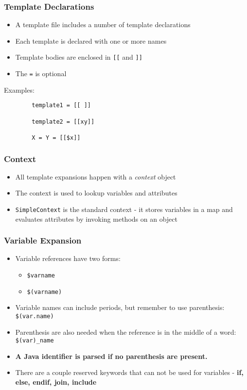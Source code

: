 \documentclass[a4paper,12pt,presentation]{beamer}
\begin{document}
\begin{frame}[fragile]
    \frametitle{Template Declarations}

    \begin{itemize}
        \item A template file includes a number of template declarations
        \item Each template is declared with one or more names
        \item Template bodies are enclosed in \verb'[[' and \verb']]'
        \item The \verb'=' is optional
    \end{itemize}

    Examples:
    \begin{verbatim}
        template1 = [[ ]]

        template2 = [[xy]]

        X = Y = [[$x]]
    \end{verbatim}
\end{frame}

\begin{frame}[fragile]
    \frametitle{Context}

    \begin{itemize}
        \item All template expansions happen with a \emph{context} object
        \item The context is used to lookup variables and attributes
        \item \verb'SimpleContext' is the standard context - it stores variables
            in a map and evaluates attributes by invoking methods on an object
    \end{itemize}
    
\end{frame}

\begin{frame}[fragile]
    \frametitle{Variable Expansion}

    \begin{itemize}
        \item Variable references have two forms:
            \begin{itemize}
                \item \verb'$varname'
                \item \verb'$(varname)'
            \end{itemize}
        \item Variable names can include periods, but remember to use
            parenthesis: \verb'$(var.name)'
        \item Parenthesis are also needed when the reference
            is in the middle of a word: \verb'$(var)_name'
        \item {\bf A Java identifier is parsed if no parenthesis are present.}
        \item There are a couple reserved keywords that can not be used for variables -
            \bf if, else, endif, join, include
    \end{itemize}
    
\end{frame}
\end{document}
